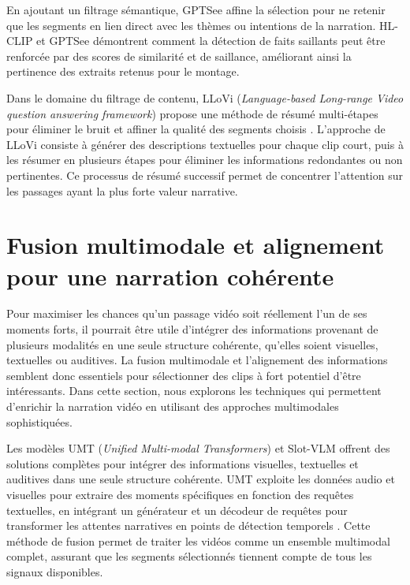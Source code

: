 En ajoutant un filtrage sémantique, GPTSee affine la sélection pour ne retenir que les segments en lien direct avec les thèmes ou intentions de la narration. HL-CLIP et GPTSee démontrent comment la détection de faits saillants peut être renforcée par des scores de similarité et de saillance, améliorant ainsi la pertinence des extraits retenus pour le montage.

Dans le domaine du filtrage de contenu, LLoVi (\textit{Language-based Long-range Video question answering framework}) \cite{zhang2023} propose une méthode de résumé multi-étapes pour éliminer le bruit et affiner la qualité des segments choisis \cite{anonymous2023_valley}\cite{zhang2019_memory}. L’approche de LLoVi consiste à générer des descriptions textuelles pour chaque clip court, puis à les résumer en plusieurs étapes pour éliminer les informations redondantes ou non pertinentes. Ce processus de résumé successif permet de concentrer l’attention sur les passages ayant la plus forte valeur narrative.

\section{Fusion multimodale et alignement pour une narration cohérente}

Pour maximiser les chances qu’un passage vidéo soit réellement l’un de ses moments forts, il pourrait être utile d’intégrer des informations provenant de plusieurs modalités en une seule structure cohérente, qu’elles soient visuelles, textuelles ou auditives. La fusion multimodale et l’alignement des informations semblent donc essentiels pour sélectionner des clips à fort potentiel d’être intéressants. Dans cette section, nous explorons les techniques qui permettent d’enrichir la narration vidéo en utilisant des approches multimodales sophistiquées.

Les modèles UMT (\textit{Unified Multi-modal Transformers}) \cite{liu2022_umt} et Slot-VLM \cite{xu2024} offrent des solutions complètes pour intégrer des informations visuelles, textuelles et auditives dans une seule structure cohérente. UMT exploite les données audio et visuelles pour extraire des moments spécifiques en fonction des requêtes textuelles, en intégrant un générateur et un décodeur de requêtes pour transformer les attentes narratives en points de détection temporels \cite{liu2022_umt}. Cette méthode de fusion permet de traiter les vidéos comme un ensemble multimodal complet, assurant que les segments sélectionnés tiennent compte de tous les signaux disponibles.

